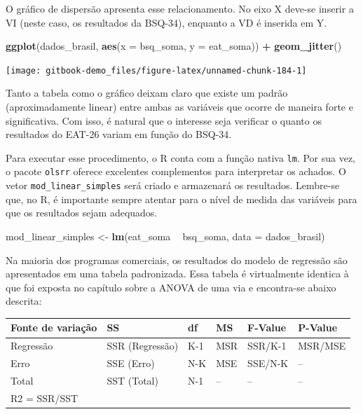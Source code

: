 \documentclass[
]{book}
\newenvironment{Shaded}{\begin{snugshade}}{\end{snugshade}}
\newcommand{\DataTypeTok}[1]{\textcolor[rgb]{0.13,0.29,0.53}{#1}}
\newcommand{\KeywordTok}[1]{\textcolor[rgb]{0.13,0.29,0.53}{\textbf{#1}}}
\newcommand{\NormalTok}[1]{#1}
\newcommand{\OperatorTok}[1]{\textcolor[rgb]{0.81,0.36,0.00}{\textbf{#1}}}
\newcommand{\StringTok}[1]{\textcolor[rgb]{0.31,0.60,0.02}{#1}}
\begin{document}
O gráfico de dispersão apresenta esse relacionamento. No eixo X deve-se
inserir a VI (neste caso, os resultados da BSQ-34), enquanto a VD é
inserida em Y.

\begin{Shaded}
\begin{Highlighting}[]
\KeywordTok{ggplot}\NormalTok{(dados_brasil, }\KeywordTok{aes}\NormalTok{(}\DataTypeTok{x =}\NormalTok{ bsq_soma, }\DataTypeTok{y =}\NormalTok{ eat_soma)) }\OperatorTok{+}
\StringTok{  }\KeywordTok{geom_jitter}\NormalTok{()}
\end{Highlighting}
\end{Shaded}

\begin{center}\texttt{[image: gitbook-demo\_files/figure-latex/unnamed-chunk-184-1]} \end{center}

Tanto a tabela como o gráfico deixam claro que existe um padrão
(aproximadamente linear) entre ambas as variáveis que ocorre de maneira
forte e significativa. Com isso, é natural que o interesse seja
verificar o quanto os resultados do EAT-26 variam em função do BSQ-34.

Para executar esse procedimento, o R conta com a função nativa
\texttt{lm}. Por sua vez, o pacote \texttt{olsrr} oferece excelentes
complementos para interpretar os achados. O vetor
\texttt{mod\_linear\_simples} será criado e armazenará os resultados.
Lembre-se que, no R, é importante sempre atentar para o nível de medida
das variáveis para que os resultados sejam adequados.

\begin{Shaded}
\begin{Highlighting}[]
\NormalTok{mod_linear_simples <-}\StringTok{ }\KeywordTok{lm}\NormalTok{(eat_soma }\OperatorTok{~}\StringTok{ }\NormalTok{bsq_soma, }\DataTypeTok{data =}\NormalTok{ dados_brasil)}
\end{Highlighting}
\end{Shaded}

Na maioria dos programas comerciais, os resultados do modelo de
regressão são apresentados em uma tabela padronizada. Essa tabela é
virtualmente identica à que foi exposta no capítulo sobre a ANOVA de uma
via e encontra-se abaixo descrita:

\begin{longtable}[]{@{}llllll@{}}
\toprule
Fonte de variação & SS & df & MS & F-Value & P-Value\tabularnewline
\midrule
\endhead
Regressão & SSR (Regressão) & K-1 & MSR & SSR/K-1 &
MSR/MSE\tabularnewline
Erro & SSE (Erro) & N-K & MSE & SSE/N-K & --\tabularnewline
Total & SST (Total) & N-1 & -- & -- & --\tabularnewline
R2 = SSR/SST & & & & &\tabularnewline
\bottomrule
\end{longtable}
\end{document}
